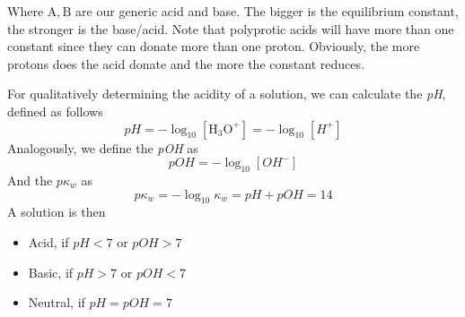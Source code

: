 \documentclass[../qm.tex]{subfiles}
\begin{document}
Where $\mathrm{A}, \mathrm{B}$ are our generic acid and base. The bigger is the equilibrium constant, the stronger is the base/acid. Note that polyprotic acids will have more than one constant since they can donate more than one proton. Obviously, the more protons does the acid donate and the more the constant reduces.
\begin{dfn}
	For qualitatively determining the acidity of a solution, we can calculate the \emph{pH}, defined as follows
	\begin{equation}
		pH=-\log_{10}\left[ \mathrm{H_3O^+} \right]=-\log_{10}\left[ H^+ \right]
	\label{eq:ph.chem}
	\end{equation}
	Analogously, we define the \emph{pOH} as
	\begin{equation}
		pOH=-\log_{10}\left[ OH^- \right]
		\label{eq:poh.chem}
	\end{equation}
	And the \emph{$p\kappa_w$} as
	\begin{equation}
		p\kappa_w=-\log_{10}\kappa_w=pH+pOH=14
		\label{eq:pkw.chem}
	\end{equation}
	A solution is then
	\begin{itemize}
	\item Acid, if $pH<7$ or $pOH>7$
	\item Basic, if $pH>7$ or $pOH<7$
	\item Neutral, if $pH=pOH=7$
	\end{itemize}
\end{dfn}
\end{document}
